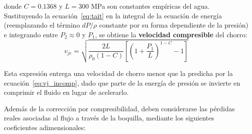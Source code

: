 donde $C=0.1368$ y $L=300$ MPa son constantes empíricas del agua. Sustituyendo la ecuación~\eqref{eq:tait} en la integral de la ecuación de energía (reemplazando el término $dP/\rho$ constante por su forma dependiente de la presión) e integrando entre $P_2\approx0$ y $P_1$, se obtiene la \textbf{velocidad compresible} del chorro:
\begin{equation}
	v_{jc} = \sqrt{\frac{2L}{\rho_0(1-C)}\left[\left(1+\frac{P_1}{L}\right)^{1-C}-1\right]}
	\label{eq:vj_comp}
\end{equation}

Esta expresión entrega una velocidad de chorro menor que la predicha por la ecuación~\eqref{eq:vj_incomp}, dado que parte de la energía de presión se invierte en comprimir el fluido en lugar de acelerarlo.

Además de la corrección por compresibilidad, deben considerarse las pérdidas reales asociadas al flujo a través de la boquilla, mediante los siguientes coeficientes adimensionales:

